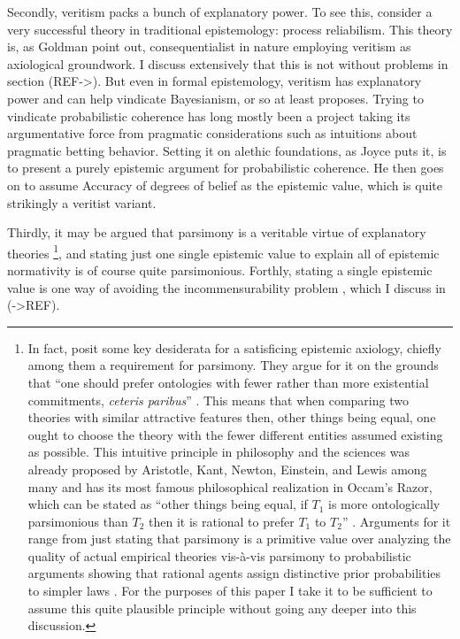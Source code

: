 \documentclass[12pt,numbers=noenddot]{scrartcl}
\begin{document}
Secondly, veritism packs a bunch of explanatory power. To see this, consider a very successful theory in traditional epistemology: process reliabilism. This theory is, as Goldman point out, consequentialist in nature \autocite{Goldman2002-GOLTUO-2} employing veritism as axiological groundwork. I discuss extensively that this is not without problems in section (REF->). But even in formal epistemology, veritism has explanatory power and can help vindicate Bayesianism, or so at least \textcite{Joyce2009-JOYAAC} proposes. Trying to vindicate probabilistic coherence has long mostly been a project taking its argumentative force from pragmatic considerations such as intuitions about pragmatic betting behavior. Setting it on alethic foundations, as Joyce puts it, is to present a purely epistemic argument for probabilistic coherence. He then goes on to assume Accuracy of degrees of belief as the epistemic value, which is quite strikingly a veritist variant.

Thirdly, it may be argued that parsimony is a veritable virtue of explanatory theories \footnote{In fact, \textcite[342]{Ahlstrom-Vij2013} posit some key desiderata for a satisficing epistemic axiology, chiefly among them a requirement for parsimony. They argue for it on the grounds that “one should prefer ontologies with fewer rather than more existential commitments, \emph{ceteris paribus}” \autocite{Ahlstrom-Vij2013}. This means that when comparing two theories with similar attractive features then, other things being equal, one ought to choose the theory with the fewer different entities assumed existing as possible. This intuitive principle in philosophy and the sciences was already proposed by Aristotle, Kant, Newton, Einstein, and Lewis among many \autocite[3]{sep-simplicity} and has its most famous philosophical realization in Occam's Razor, which can be stated as “other things being equal, if $T_1$ is more ontologically parsimonious than $T_2$ then it is rational to prefer $T_1$ to $T_2$” \autocite[7]{sep-simplicity}. Arguments for it range from just stating that parsimony is a primitive value over analyzing the quality of actual empirical theories vis-à-vis parsimony to probabilistic arguments showing that rational agents assign distinctive prior probabilities to simpler laws \autocite[11-26]{sep-simplicity}. For the purposes of this paper I take it to be sufficient to assume this quite plausible principle without going any deeper into this discussion.},
and stating just one single epistemic value to explain all of epistemic normativity is of course quite parsimonious.
Forthly, stating a single epistemic value is one way of avoiding the incommensurability problem \autocite[16]{sep-value-theory}, which I discuss in (->REF).
\end{document}
